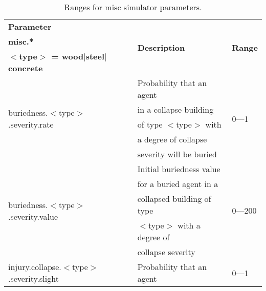 \documentclass{article}
\begin{document}
\begin{table}[htb]
\caption{Ranges for misc simulator parameters.}
\label{tab:11}
\centering
\begin{tabular}{lll}
  \hline
  \textbf{Parameter}                                            &
  \multirow{3}{*}{\textbf{Description}} & \multirow{3}{*}{\textbf{Range}}\\
  \textbf{misc.*}                                               &              
                                        & \\
  \textbf{$<$type$>$ = wood$|$steel$|$concrete}                 &              
                                        & \\
  \hline
  \multirow{5}{*}{buriedness.$<$type$>$.severity.rate}          & Probability 
  that an agent                         & \multirow{5}{*}{0---1}\\
                                                                & in a collapse
  building                              & \\
                                                                & of type
  $<$type$>$ with                       & \\
                                                                & a degree of
  collapse                              & \\
                                                                & severity will
   be buried                            & \\
  \hline
  \multirow{5}{*}{buriedness.$<$type$>$.severity.value}         & Initial 
  buriedness value                      & \multirow{5}{*}{0---200}\\
                                                                & for a buried
  agent in a                            & \\
                                                                & collapsed
   building of type                     & \\
                                                                & $<$type$>$
  with a degree of                      & \\
                                                                & collapse
  severity                              & \\
  \hline
  \multirow{5}{*}{injury.collapse.$<$type$>$.severity.slight}   &  Probability
  that an agent                         & \multirow{5}{*}{0---1}\\

\end{tabular}
\end{table}
\end{document}
